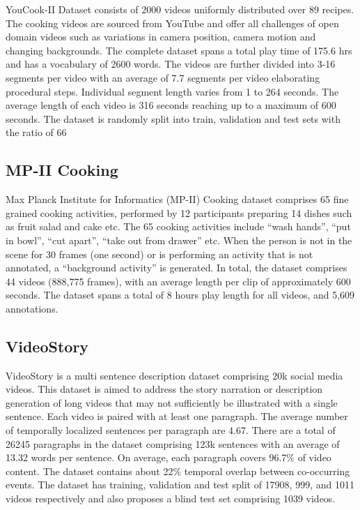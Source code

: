 \par YouCook-II Dataset consists of 2000 videos uniformly distributed over 89 recipes. The cooking videos are sourced from YouTube and offer all challenges of open domain videos such as variations in camera position, camera motion and changing backgrounds. The complete dataset spans a total play time of 175.6 hrs and has a vocabulary of 2600 words. The videos are further divided into 3-16 segments per video with an average of 7.7 segments per video elaborating procedural steps. Individual segment length varies from 1 to 264 seconds. The average length of each video is 316 seconds reaching up to a maximum of 600 seconds. The dataset is randomly split into train, validation and test sets with the ratio of 66%

\subsection{MP-II Cooking}

\par Max Planck Institute for Informatics (MP-II) Cooking dataset comprises 65 fine grained cooking activities, performed by 12 participants preparing 14 dishes such as fruit salad and cake etc. The 65 cooking activities include “wash hands”, “put in bowl”, “cut apart”, “take out from drawer” etc. When the person is not in the scene for 30 frames (one second) or is performing an activity that is not annotated, a “background activity” is generated. In total, the dataset comprises 44 videos (888,775 frames), with an average length per clip of approximately 600 seconds. The dataset spans a total of 8 hours play length for all videos, and 5,609 annotations.

\subsection{VideoStory}

\par VideoStory is a multi sentence description dataset comprising 20k social media videos. This dataset is aimed to address the story narration or description generation of long videos that may not sufficiently be illustrated with a single sentence. Each video is paired with at least one paragraph. The average number of temporally localized sentences per paragraph are 4.67. There are a total of 26245 paragraphs in the dataset comprising 123k sentences with an average of 13.32 words per sentence. On average, each paragraph covers 96.7\% of video content. The dataset contains about 22\% temporal overlap between co-occurring events. The dataset has training, validation and test split of 17908, 999, and 1011 videos respectively and also proposes a blind test set comprising 1039 videos. 

